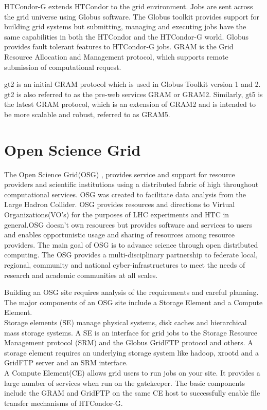\documentclass[ms,electronic,double]{nuthesis}
\begin{document}
HTCondor-G extends HTCondor to the grid environment. Jobs are sent across the grid universe using 
Globus software. The Globus toolkit provides support for building grid systems but 
submitting, managing and executing jobs have the same capabilities in both the HTCondor 
and the HTCondor-G world. Globus provides fault tolerant features to HTCondor-G 
jobs. GRAM is the Grid Resource Allocation and Management protocol, which supports remote 
submission of computational request.

gt2 is an initial GRAM protocol which is used in Globus Toolkit version 1 and 
2. gt2 is also referred to as the pre-web services GRAM or GRAM2. Similarly, gt5 is the latest GRAM protocol, which is an extension of GRAM2 and is intended 
to be more scalable and robust, referred to as GRAM5.

\section{Open Science Grid} The Open Science Grid(OSG) \cite{osg}, provides service and support 
for resource providers and scientific institutions using a distributed fabric of 
high throughout computational services. OSG was created to facilitate data analysis from the 
Large Hadron Collider\cite{osg}. 
OSG provides resources and directions to Virtual Organizations(VO's) for the purposes of LHC experiments
and HTC in general.OSG doesn't own resources but provides software and services to 
users and enables opportunistic usage and sharing of resources among resource providers.
The main goal of OSG is to advance science through open distributed computing. 
The OSG provides a multi-disciplinary partnership to federate local, regional, community and 
national cyber-infrastructures to meet the needs of research and academic communities at all scales.

Building an OSG site requires analysis of the requirements and careful planning. The major 
components of an OSG site include a Storage Element and a Compute Element. \\
Storage elements (SE) manage physical systems, disk caches and hierarchical mass storage 
systems. A SE is an interface for grid jobs to the Storage Resource Management protocol (SRM) and the Globus 
GridFTP protocol and others. A storage element requires an underlying storage system like hadoop, xrootd
and a GridFTP server and an SRM interface.\\
A Compute Element(CE) allows grid users to run jobs on your site. It provides a 
large number of services when run on the gatekeeper. The basic components include 
the GRAM and GridFTP on the same CE host to successfully enable file transfer 
mechanisms of HTCondor-G.\\
\end{document}
